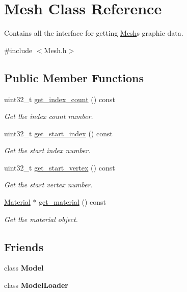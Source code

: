 \hypertarget{classMesh}{}\section{Mesh Class Reference}
\label{classMesh}


Contains all the interface for getting \hyperlink{classMesh}{Mesh}\textquotesingle{}s graphic data.  




{\ttfamily \#include $<$Mesh.\+h$>$}

\subsection*{Public Member Functions}
\begin{DoxyCompactItemize}
\item 
uint32\+\_\+t \hyperlink{classMesh_a2728b2c9d70d9b7cb5df407bad0b1057}{get\+\_\+index\+\_\+count} () const
\begin{DoxyCompactList}\small\item\em Get the index count number. \end{DoxyCompactList}\item 
uint32\+\_\+t \hyperlink{classMesh_ac6ff36aa0676d9cae667631056e868b3}{get\+\_\+start\+\_\+index} () const
\begin{DoxyCompactList}\small\item\em Get the start index number. \end{DoxyCompactList}\item 
uint32\+\_\+t \hyperlink{classMesh_a203b83303bf3419d2c82a8078a876bee}{get\+\_\+start\+\_\+vertex} () const
\begin{DoxyCompactList}\small\item\em Get the start vertex number. \end{DoxyCompactList}\item 
\hyperlink{classMaterial}{Material} $\ast$ \hyperlink{classMesh_aef61adb0e64d3124731090da8f43977f}{get\+\_\+material} () const
\begin{DoxyCompactList}\small\item\em Get the material object. \end{DoxyCompactList}\end{DoxyCompactItemize}
\subsection*{Friends}
\begin{DoxyCompactItemize}
\item 
\mbox{\label{classMesh_a2bf2a0e9b454c55aa5dcb5aa4698697b}} 
class {\bfseries Model}
\item 
\mbox{\label{classMesh_ac22dade55c1e8f81ea3e0892cd321190}} 
class {\bfseries Model\+Loader}
\end{DoxyCompactItemize}


